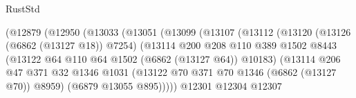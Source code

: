 \begin{lexlean}{RustStd}
\begin{coremodule}
                                        (@12879
                                          (@12950
                                            (@13033
                                              (@13051
                                                (@13099
                                                  (@13107
                                                    (@13112
                                                      (@13120
                                                        (@13126 (@6862 (@13127 @18)) @7254)
                                                        (@13114
                                                          @200
                                                          @208
                                                          @110
                                                          @389
                                                          @1502
                                                          @8443
                                                          (@13122
                                                            @64
                                                            @110
                                                            @64
                                                            @1502
                                                            (@6862 (@13127 @64))
                                                            @10183)
                                                          (@13114
                                                            @206
                                                            @47
                                                            @371
                                                            @32
                                                            @1346
                                                            @1031
                                                            (@13122
                                                              @70
                                                              @371
                                                              @70
                                                              @1346
                                                              (@6862 (@13127 @70))
                                                              @8959)
                                                            (@6879 @13055 @895)))))
                                                    @12301
                                                    @12304
                                                    @12307

\end{coremodule}
\end{lexlean}
